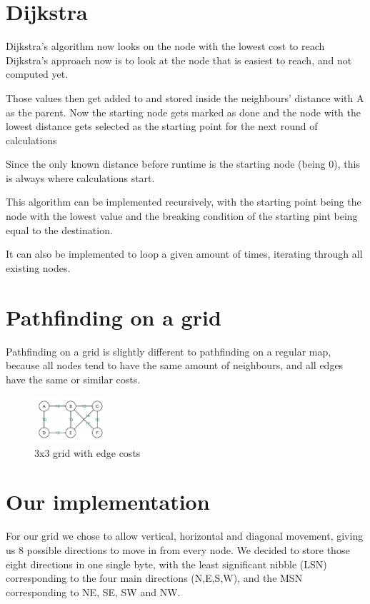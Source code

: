 \section{Dijkstra}\label{sec:dijkstra}
Dijkstra's algorithm now looks on the node with the lowest cost to reach
Dijkstra's approach now is to look at the node that is easiest to reach,
and not computed yet.

Those values then get added to and stored  inside the neighbours' distance with A as the parent.
Now the starting node gets marked as done
and the node with the lowest distance gets selected
as the starting point for the next round of calculations

Since the only known distance before runtime is the starting node (being 0),
this is always where calculations start.

This algorithm can be implemented recursively,
with the starting point being the node with the lowest value
and the breaking condition of the starting pint being equal to the destination.

It can also be implemented to loop a given amount of times,
iterating through all existing nodes.

\section{Pathfinding on a grid}
Pathfinding on a grid is slightly different to pathfinding on a regular map,
because all nodes tend to have the same amount of neighbours,
and all edges have the same or similar costs.
\begin{figure}[htp]
	\centering
	\includegraphics[width=0.24\textwidth]{figures/path/graph_values}
	\caption{3x3 grid with edge costs}
	\label{fig:graph_cost}
\end{figure}


\section{Our implementation}
For our grid we chose to allow vertical, horizontal and diagonal movement,
giving us 8 possible directions to move in from every node.
We decided to store those eight directions in one single byte,
with the least significant nibble (LSN) corresponding to the four main directions (N,E,S,W),
and the MSN corresponding to NE, SE, SW and NW.

